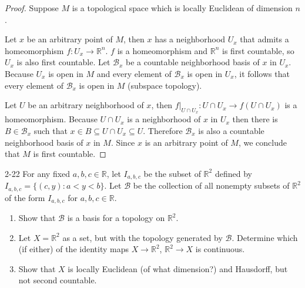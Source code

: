 \begin{proof}
	Suppose $M$ is a topological space which is locally Euclidean of dimension $n$.

	Let $x$ be an arbitrary point of $M$, then $x$ has a neighborhood $U_{x}$ that admits a homeomorphism $f: U_{x}\to \mathbb{R}^{n}$. $f$ is a homeomorphism and $\mathbb{R}^{n}$ is first countable, so $U_{x}$ is also first countable. Let $\mathscr{B}_{x}$ be a countable neighborhood basis of $x$ in $U_{x}$. Because $U_{x}$ is open in $M$ and every element of $\mathscr{B}_{x}$ is open in $U_{x}$, it follows that every element of $\mathscr{B}_{x}$ is open in $M$ (subspace topology).

	Let $U$ be an arbitrary neighborhood of $x$, then $f\vert_{U\cap U_{x}}: U\cap U_{x}\to f(U\cap U_{x})$ is a homeomorphism. Because $U\cap U_{x}$ is a neighborhood of $x$ in $U_{x}$ then there is $B\in \mathscr{B}_{x}$ such that $x\in B\subseteq U\cap U_{x}\subseteq U$. Therefore $\mathscr{B}_{x}$ is also a countable neighborhood basis of $x$ in $M$. Since $x$ is an arbitrary point of $M$, we conclude that $M$ is first countable.
\end{proof}

\begin{problem}{2-22}\label{problem:2-22}
For any fixed $a, b, c\in\mathbb{R}$, let $I_{a,b,c}$ be the subset of $\mathbb{R}^{2}$ defined by $I_{a,b,c} = \{ (c, y): a < y < b \}$. Let $\mathscr{B}$ be the collection of all nonempty subsets of $\mathbb{R}^{2}$ of the form $I_{a,b,c}$ for $a, b, c\in\mathbb{R}$.
\begin{enumerate}[label={(\alph*)}]
	\item Show that $\mathscr{B}$ is a basis for a topology on $\mathbb{R}^{2}$.
	\item Let $X = \mathbb{R}^{2}$ as a set, but with the topology generated by $\mathscr{B}$. Determine which (if either) of the identity maps $X\to \mathbb{R}^{2}$, $\mathbb{R}^{2}\to X$ is continuous.
	\item Show that $X$ is locally Euclidean (of what dimension?) and Hausdorff, but not second countable.
\end{enumerate}
\end{problem}

